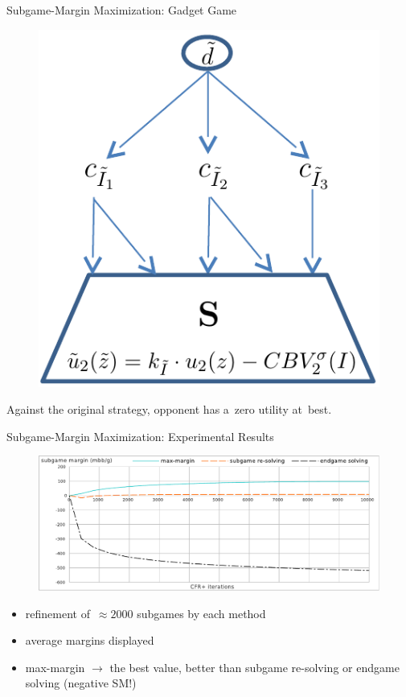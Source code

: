 \documentclass{beamer}
\theoremstyle{definition}
\begin{document}
{    \begin{frame}{Subgame-Margin Maximization: Gadget Game}
      \begin{figure}
        \centering
        \includegraphics[width=.5\textwidth]{../img/max-margin-gadget.png}
      \end{figure}
      \pause

      Against the original strategy, opponent has a~zero utility at~best.
    \end{frame}

    \begin{frame}{Subgame-Margin Maximization: Experimental Results}
      \begin{figure}[H]
        \centering
        \includegraphics[width=\textwidth]{../img/sm-experiments}
      \end{figure}
      \pause

      \begin{itemize}[<+- | alert@+>]
        \item refinement of~$\approx 2000$ subgames by each method
        \item average margins displayed
        \item max-margin $\to$ the best value, better than subgame re-solving or endgame solving (negative SM!)
      \end{itemize}
    \end{frame}
  }
\end{document}
